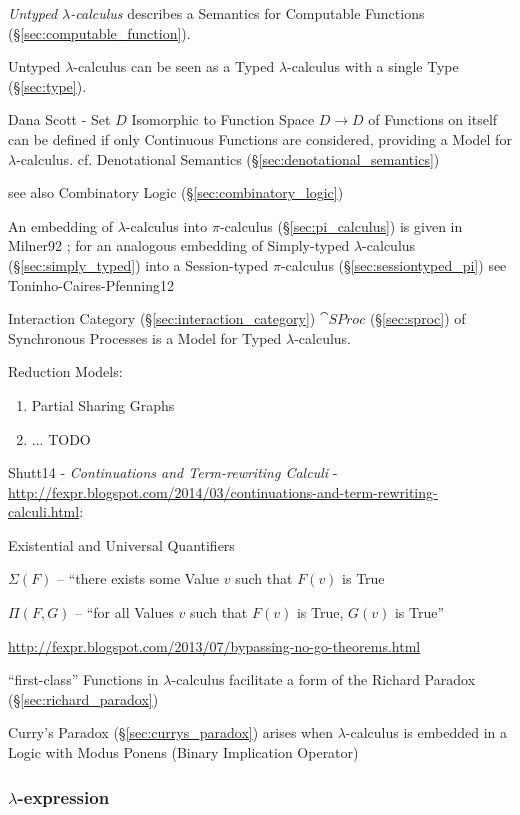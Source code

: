 \emph{Untyped $\lambda$-calculus} describes a Semantics for Computable
Functions (\S\ref{sec:computable_function}).

Untyped $\lambda$-calculus can be seen as a Typed $\lambda$-calculus
with a single Type (\S\ref{sec:type}).

Dana Scott - Set $D$ Isomorphic to Function Space $D \rightarrow D$ of
Functions on itself can be defined if only Continuous Functions are
considered, providing a Model for $\lambda$-calculus. cf. Denotational
Semantics (\S\ref{sec:denotational_semantics})

\fist see also Combinatory Logic (\S\ref{sec:combinatory_logic})

\fist An embedding of $\lambda$-calculus into $\pi$-calculus
(\S\ref{sec:pi_calculus}) is given in Milner92 \cite{milner92}; for an
analogous embedding of Simply-typed $\lambda$-calculus
(\S\ref{sec:simply_typed}) into a Session-typed $\pi$-calculus
(\S\ref{sec:sessiontyped_pi}) see Toninho-Caires-Pfenning12
\cite{caires-pfenning-toninho12}

Interaction Category (\S\ref{sec:interaction_category}) $\cat{SProc}$
(\S\ref{sec:sproc}) of Synchronous Processes is a Model for Typed
$\lambda$-calculus.

Reduction Models:
\begin{enumerate}
  \item Partial Sharing Graphs
  \item ... TODO
\end{enumerate}


Shutt14 - \emph{Continuations and Term-rewriting Calculi} -
\url{http://fexpr.blogspot.com/2014/03/continuations-and-term-rewriting-calculi.html}:

Existential and Universal Quantifiers

$\Sigma(F)$ -- ``there exists some Value $v$ such that $F(v)$ is True

$\Pi(F,G)$ -- ``for all Values $v$ such that $F(v)$ is True, $G(v)$ is
True''

\url{http://fexpr.blogspot.com/2013/07/bypassing-no-go-theorems.html}

``first-class'' Functions in $\lambda$-calculus facilitate a form of
the Richard Paradox (\S\ref{sec:richard_paradox})

Curry's Paradox (\S\ref{sec:currys_paradox}) arises when
$\lambda$-calculus is embedded in a Logic with Modus Ponens (Binary
Implication Operator)



\subsubsection{$\lambda$-expression}\label{sec:lambda_expression}

